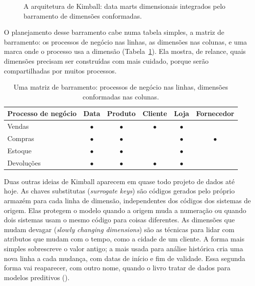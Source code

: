 \begin{figure}[htbp]
  \centering
  
  \caption{A arquitetura de Kimball: data marts dimensionais integrados pelo barramento de dimensões conformadas.}
  \label{fig:kimball}
\end{figure}

O planejamento desse barramento cabe numa tabela simples, a matriz de barramento: os
processos de negócio nas linhas, as dimensões nas colunas, e uma marca onde o processo
usa a dimensão (Tabela~\ref{tab:matriz-barramento}). Ela mostra, de relance, quais
dimensões precisam ser construídas com mais cuidado, porque serão compartilhadas por
muitos processos.

\begin{table}[htbp]
  \centering
  \caption{Uma matriz de barramento: processos de negócio nas linhas, dimensões conformadas nas colunas.}
  \label{tab:matriz-barramento}
  \small
  \begin{tabular}{@{}lccccc@{}}
    \toprule
    Processo de negócio & Data & Produto & Cliente & Loja & Fornecedor \\
    \midrule
    Vendas      & $\bullet$ & $\bullet$ & $\bullet$ & $\bullet$ &           \\
    Compras     & $\bullet$ & $\bullet$ &           & $\bullet$ & $\bullet$ \\
    Estoque     & $\bullet$ & $\bullet$ &           & $\bullet$ &           \\
    Devoluções  & $\bullet$ & $\bullet$ & $\bullet$ & $\bullet$ &           \\
    \bottomrule
  \end{tabular}
\end{table}

Duas outras ideias de Kimball aparecem em quase todo projeto de dados até hoje. As
chaves substitutas (\emph{surrogate keys}) são códigos gerados pelo próprio armazém para
cada linha de dimensão, independentes dos códigos dos sistemas de origem. Elas protegem o
modelo quando a origem muda a numeração ou quando dois sistemas usam o mesmo código para
coisas diferentes. As dimensões que mudam devagar (\emph{slowly changing dimensions})
são as técnicas para lidar com atributos que mudam com o tempo, como a cidade de um
cliente. A forma mais simples sobrescreve o valor antigo; a mais usada para análise
histórica cria uma nova linha a cada mudança, com datas de início e fim de validade.
Essa segunda forma vai reaparecer, com outro nome, quando o livro tratar de dados para
modelos preditivos ().

